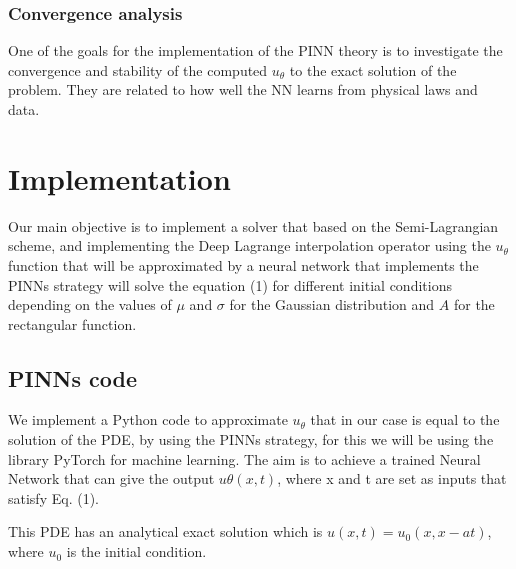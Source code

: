 \documentclass{article}
\begin{document}
\subsubsection{Convergence analysis}
One of the goals for the implementation of the PINN theory is to investigate the convergence and stability of the computed $u_\theta$ to the exact solution of the problem. They are related to how well the NN learns from physical laws and data.



\section{Implementation}
Our main objective is to implement a solver that based on the Semi-Lagrangian scheme, and implementing the Deep Lagrange interpolation operator 
using the $u_\theta$ function that will be approximated by a neural network that implements the PINNs strategy will solve the equation (1) for different initial conditions depending on the values of $\mu$ and $\sigma$ for the Gaussian distribution and $A$ for the rectangular function.

\subsection{PINNs code}

We implement a Python code to approximate  $u_\theta$ that in our case is equal to the solution of the PDE, by using the PINNs strategy, for this we will be using the library PyTorch for machine learning.
The aim is to achieve a trained Neural Network that can give the output $u\theta(x, t)$, where x and t are set as inputs that satisfy Eq. (1). 

This PDE has an analytical exact solution which is $u(x,t) = u_0(x,x-at)$, where $u_0$ is the initial condition.
\end{document}
